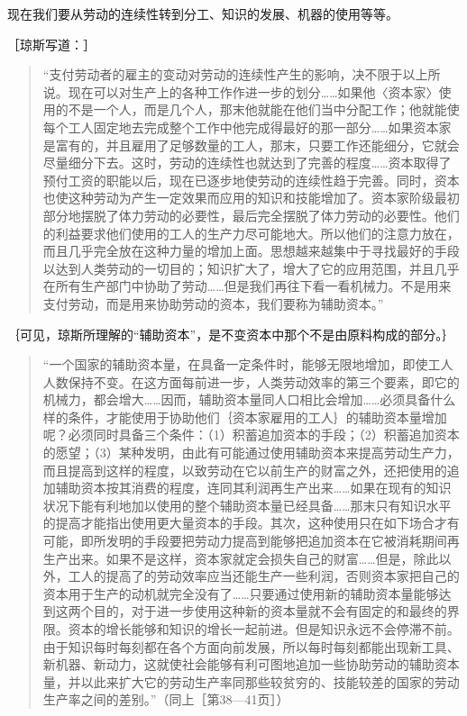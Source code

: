 现在我们要从劳动的连续性转到分工、知识的发展、机器的使用等等。

［琼斯写道：］

\begin{quote}{“支付劳动者的雇主的变动对劳动的连续性产生的影响，决不限于以上所说。现在可以对生产上的各种工作作进一步的划分……如果他〈资本家〉使用的不是一个人，而是几个人，那末他就能在他们当中分配工作；他就能使每个工人固定地去完成整个工作中他完成得最好的那一部分……如果资本家是富有的，并且雇用了足够数量的工人，那末，只要工作还能细分，它就会尽量细分下去。这时，劳动的连续性也就达到了完善的程度……资本取得了预付工资的职能以后，现在已逐步地使劳动的连续性趋于完善。同时，资本也使这种劳动为产生一定效果而应用的知识和技能增加了。资本家阶级最初部分地摆脱了体力劳动的必要性，最后完全摆脱了体力劳动的必要性。他们的利益要求他们使用的工人的生产力尽可能地大。所以他们的注意力放在，而且几乎完全放在这种力量的增加上面。思想越来越集中于寻找最好的手段以达到人类劳动的一切目的；知识扩大了，增大了它的应用范围，并且几乎在所有生产部门中协助了劳动……但是我们再往下看一看机械力。不是用来支付劳动，而是用来协助劳动的资本，我们要称为辅助资本。”}\end{quote}

｛可见，琼斯所理解的“辅助资本”，是不变资本中那个不是由原料构成的部分。｝

\begin{quote}{“一个国家的辅助资本量，在具备一定条件时，能够无限地增加，即使工人人数保持不变。在这方面每前进一步，人类劳动效率的第三个要素，即它的机械力，都会增大……因而，辅助资本量同人口相比会增加……必须具备什么样的条件，才能使用于协助他们｛资本家雇用的工人｝的辅助资本量增加呢？必须同时具备三个条件：（1）积蓄追加资本的手段；（2）积蓄追加资本的愿望；（3）某种发明，由此有可能通过使用辅助资本来提高劳动生产力，而且提高到这样的程度，以致劳动在它以前生产的财富之外，还把使用的追加辅助资本按其消费的程度，连同其利润再生产出来……如果在现有的知识状况下能有利地加以使用的整个辅助资本量已经具备……那末只有知识水平的提高才能指出使用更大量资本的手段。其次，这种使用只在如下场合才有可能，即所发明的手段要把劳动力提高到能够把追加资本在它被消耗期间再生产出来。如果不是这样，资本家就定会损失自己的财富……但是，除此以外，工人的提高了的劳动效率应当还能生产一些利润，否则资本家把自己的资本用于生产的动机就完全没有了……只要通过使用新的辅助资本量能够达到这两个目的，对于进一步使用这种新的资本量就不会有固定的和最终的界限。资本的增长能够和知识的增长一起前进。但是知识永远不会停滞不前。由于知识每时每刻都在各个方面向前发展，所以每时每刻都能出现新工具、新机器、新动力，这就使社会能够有利可图地追加一些协助劳动的辅助资本量，并以此来扩大它的劳动生产率同那些较贫穷的、技能较差的国家的劳动生产率之间的差别。”（同上［第38—41页］）}\end{quote}


